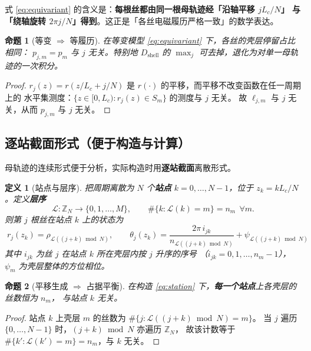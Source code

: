 \documentclass[12pt, a4paper]{ctexart}
\newtheorem{definition}{定义}[section]
\newtheorem{proposition}{命题}[section]
\begin{document}
式 \eqref{eq:equivariant} 的含义是：\textbf{每根丝都由同一根母轨迹经「沿轴平移 $jL_c/N$」
与「绕轴旋转 $2\pi j/N$」得到}。这正是「各丝电磁履历严格一致」的数学表达。

\begin{proposition}[等变 $\Rightarrow$ 等履历]
\label{prop:equiv}
在等变模型 \eqref{eq:equivariant} 下，各丝的壳层停留占比相同：
$p_{j,m} = p_{m}$ 与 $j$ 无关。特别地
$D_{\mathrm{shell}}$ 的 $\max_j$ 可去掉，退化为对单一母轨迹的一次积分。
\end{proposition}

\begin{proof}
$r_j(z) = r(z/L_c+j/N)$ 是 $r(\cdot)$ 的平移，而平移不改变函数在任一周期上的
水平集测度：$\{z\in[0,L_c): r_j(z)\in S_m\}$ 的测度与 $j$ 无关。
故 $\ell_{j,m}$ 与 $j$ 无关，从而 $p_{j,m}$ 与 $j$ 无关。
\end{proof}

\subsection{逐站截面形式（便于构造与计算）}

母轨迹的连续形式便于分析，实际构造时用\textbf{逐站截面}离散形式。

\begin{definition}[站点与层序]
把周期离散为 $N$ 个\textbf{站点} $k=0,\dots,N-1$，位于
$z_k = kL_c/N$。定义\textbf{层序}
\begin{equation}
\mathcal{L}:\mathbb{Z}_N\to\{0,1,\dots,M\},\qquad
\#\{k:\mathcal{L}(k)=m\} = n_m\ \ \forall m .
\end{equation}
则第 $j$ 根丝在站点 $k$ 上的状态为
\begin{equation}
\boxed{\;
r_j(z_k) = \rho_{\mathcal{L}((j+k)\bmod N)},\qquad
\theta_j(z_k) = \frac{2\pi\, i_{jk}}{n_{\mathcal{L}((j+k)\bmod N)}} + \psi_{\mathcal{L}((j+k)\bmod N)}
\;}
\label{eq:station}
\end{equation}
其中 $i_{jk}$ 为丝 $j$ 在站点 $k$ 所在壳层内按 $j$ 升序的序号
（$i_{jk}=0,1,\dots,n_m-1$），$\psi_m$ 为壳层整体的方位相位。
\end{definition}

\begin{proposition}[平移生成 $\Rightarrow$ 占据平衡]
\label{prop:occupancy}
在构造 \eqref{eq:station} 下，\textbf{每一个站点}上各壳层的丝数恒为 $n_m$，
与站点 $k$ 无关。
\end{proposition}

\begin{proof}
站点 $k$ 上壳层 $m$ 的丝数为
$\#\{j: \mathcal{L}((j+k)\bmod N)=m\}$。
当 $j$ 遍历 $\{0,\dots,N-1\}$ 时，$(j+k)\bmod N$ 亦遍历 $\mathbb{Z}_N$，
故该计数等于 $\#\{k':\mathcal{L}(k')=m\}=n_m$，与 $k$ 无关。
\end{proof}
\end{document}
